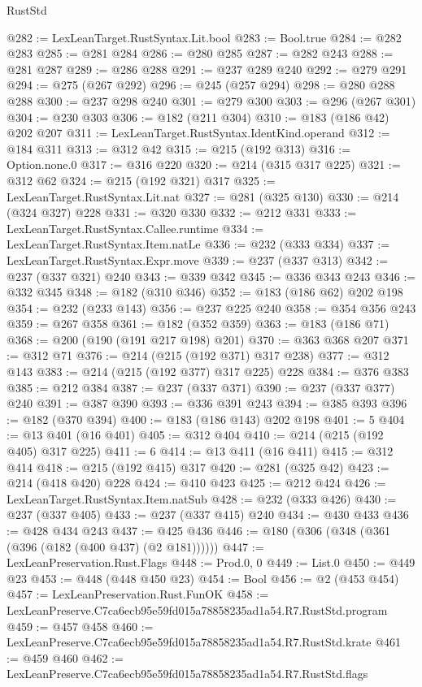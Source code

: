 \begin{lexlean}{RustStd}
\begin{coremodule}
@282 := LexLeanTarget.RustSyntax.Lit.bool
@283 := Bool.true
@284 := @282 @283
@285 := @281 @284
@286 := @280 @285
@287 := @282 @243
@288 := @281 @287
@289 := @286 @288
@291 := @237 @289 @240
@292 := @279 @291
@294 := @275 (@267 @292)
@296 := @245 (@257 @294)
@298 := @280 @288 @288
@300 := @237 @298 @240
@301 := @279 @300
@303 := @296 (@267 @301)
@304 := @230 @303
@306 := @182 (@211 @304)
@310 := @183 (@186 @42) @202 @207
@311 := LexLeanTarget.RustSyntax.IdentKind.operand
@312 := @184 @311
@313 := @312 @42
@315 := @215 (@192 @313)
@316 := Option.none.{0}
@317 := @316 @220
@320 := @214 (@315 @317 @225)
@321 := @312 @62
@324 := @215 (@192 @321) @317
@325 := LexLeanTarget.RustSyntax.Lit.nat
@327 := @281 (@325 @130)
@330 := @214 (@324 @327) @228
@331 := @320 @330
@332 := @212 @331
@333 := LexLeanTarget.RustSyntax.Callee.runtime
@334 := LexLeanTarget.RustSyntax.Item.natLe
@336 := @232 (@333 @334)
@337 := LexLeanTarget.RustSyntax.Expr.move
@339 := @237 (@337 @313)
@342 := @237 (@337 @321) @240
@343 := @339 @342
@345 := @336 @343 @243
@346 := @332 @345
@348 := @182 (@310 @346)
@352 := @183 (@186 @62) @202 @198
@354 := @232 (@233 @143)
@356 := @237 @225 @240
@358 := @354 @356 @243
@359 := @267 @358
@361 := @182 (@352 @359)
@363 := @183 (@186 @71)
@368 := @200 (@190 (@191 @217 @198) @201)
@370 := @363 @368 @207
@371 := @312 @71
@376 := @214 (@215 (@192 @371) @317 @238)
@377 := @312 @143
@383 := @214 (@215 (@192 @377) @317 @225) @228
@384 := @376 @383
@385 := @212 @384
@387 := @237 (@337 @371)
@390 := @237 (@337 @377) @240
@391 := @387 @390
@393 := @336 @391 @243
@394 := @385 @393
@396 := @182 (@370 @394)
@400 := @183 (@186 @143) @202 @198
@401 := 5
@404 := @13 @401 (@16 @401)
@405 := @312 @404
@410 := @214 (@215 (@192 @405) @317 @225)
@411 := 6
@414 := @13 @411 (@16 @411)
@415 := @312 @414
@418 := @215 (@192 @415) @317
@420 := @281 (@325 @42)
@423 := @214 (@418 @420) @228
@424 := @410 @423
@425 := @212 @424
@426 := LexLeanTarget.RustSyntax.Item.natSub
@428 := @232 (@333 @426)
@430 := @237 (@337 @405)
@433 := @237 (@337 @415) @240
@434 := @430 @433
@436 := @428 @434 @243
@437 := @425 @436
@446 := @180 (@306 (@348 (@361 (@396 (@182 (@400 @437) (@2 @181))))))
@447 := LexLeanPreservation.Rust.Flags
@448 := Prod.{0, 0}
@449 := List.{0}
@450 := @449 @23
@453 := @448 (@448 @450 @23)
@454 := Bool
@456 := @2 (@453 @454)
@457 := LexLeanPreservation.Rust.FunOK
@458 := LexLeanPreserve.C7ca6ecb95e59fd015a78858235ad1a54.R7.RustStd.program
@459 := @457 @458
@460 := LexLeanPreserve.C7ca6ecb95e59fd015a78858235ad1a54.R7.RustStd.krate
@461 := @459 @460
@462 := LexLeanPreserve.C7ca6ecb95e59fd015a78858235ad1a54.R7.RustStd.flags

\end{coremodule}
\end{lexlean}
